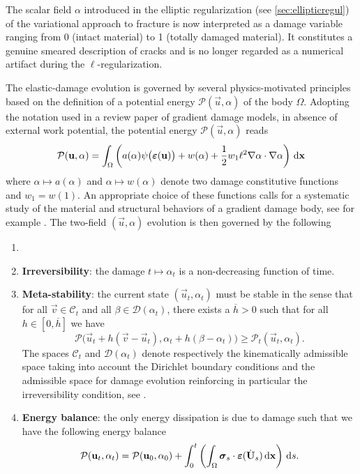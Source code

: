 The scalar field $\alpha$ introduced in the elliptic regularization (see \cref{sec:ellipticregul}) of the variational approach to fracture is now interpreted as a damage variable ranging from 0 (intact material) to 1 (totally damaged material). It constitutes a genuine smeared description of cracks and is no longer regarded as a numerical artifact during the $\ell$-regularization.

The elastic-damage evolution is governed by several physics-motivated principles based on the definition of a potential energy $\mathcal{P}(\vec{u},\alpha)$ of the body $\Omega$. Adopting the notation used in a review paper \cite{PhamAmorMarigoMaurini:2011} of gradient damage models, in absence of external work potential, the potential energy $\mathcal{P}(\vec{u},\alpha)$ reads
\begin{equation} \label{eq:Pgd}
\mathcal{P}(\vec{u},\alpha)=\int_\Omega\left( a(\alpha)\psi\bigl(\eps(\vec{u})\bigr)+w(\alpha)+\frac{1}{2}w_1\ell^2\nabla\alpha\cdot\nabla\alpha\right)\dx
\end{equation}
where $\alpha\mapsto a(\alpha)$ and $\alpha\mapsto w(\alpha)$ denote two damage constitutive functions and $w_1=w(1)$. An appropriate choice of these functions calls for a systematic study of the material and structural behaviors of a gradient damage body, see for example \cite{PhamMarigo:2013,PhamAmorMarigoMaurini:2011,PhamMarigoMaurini:2011}. The two-field $(\vec{u},\alpha)$ evolution is then governed by the following
\begin{definition}
\begin{enumerate}
\item[]
\item \textbf{Irreversibility}: the damage $t\mapsto\alpha_t$ is a non-decreasing function of time.

\item \textbf{Meta-stability}: the current state $(\vec{u}_t,\alpha_t)$ must be stable in the sense that for all $\vec{v}\in\mathcal{C}_t$ and all $\beta\in\mathcal{D}(\alpha_t)$, there exists a $\overline{h}>0$ such that for all $h\in[0,\overline{h}]$ we have
\begin{equation} \label{eq:qsstability}
\mathcal{P}\bigl(\vec{u}_t+h(\vec{v}-\vec{u}_t),\alpha_t+h(\beta-\alpha_t)\bigr)\geq\mathcal{P}_t(\vec{u}_t,\alpha_t).
\end{equation}
The spaces $\mathcal{C}_t$ and $\mathcal{D}(\alpha_t)$ denote respectively the kinematically admissible space taking into account the Dirichlet boundary conditions and the admissible space for damage evolution reinforcing in particular the irreversibility condition, see \cite{PhamAmorMarigoMaurini:2011}.

\item \textbf{Energy balance}: the only energy dissipation is due to damage such that we have the following energy balance
\begin{equation} \label{eq:qseb}
\mathcal{P}(\vec{u}_t,\alpha_t)=\mathcal{P}(\vec{u}_0,\alpha_0)+\int_0^t\left(\int_\Omega\sig_s\cdot\eps(\dot{\vec{U}}_s)\dx\right)\D{s}.
\end{equation}
\end{enumerate}
\end{definition}


